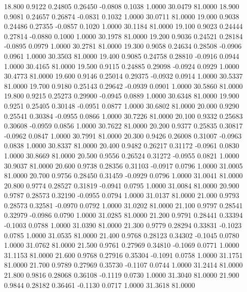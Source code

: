   18.800   0.9122   0.24805   0.26450  -0.0808   0.1038   1.0000  30.0479  81.0000
  18.900   0.9081   0.24657   0.26874  -0.0831   0.1032   1.0000  30.0711  81.0000
  19.000   0.9038   0.24486   0.27355  -0.0857   0.1020   1.0000  30.1184  81.0000
  19.100   0.9023   0.24444   0.27814  -0.0880   0.1000   1.0000  30.1978  81.0000
  19.200   0.9036   0.24521   0.28184  -0.0895   0.0979   1.0000  30.2781  81.0000
  19.300   0.9058   0.24634   0.28508  -0.0906   0.0961   1.0000  30.3503  81.0000
  19.400   0.9085   0.24758   0.28810  -0.0916   0.0944   1.0000  30.4165  81.0000
  19.500   0.9115   0.24885   0.29098  -0.0924   0.0929   1.0000  30.4773  81.0000
  19.600   0.9146   0.25014   0.29375  -0.0932   0.0914   1.0000  30.5337  81.0000
  19.700   0.9180   0.25143   0.29642  -0.0939   0.0901   1.0000  30.5860  81.0000
  19.800   0.9215   0.25273   0.29900  -0.0945   0.0889   1.0000  30.6348  81.0000
  19.900   0.9251   0.25405   0.30148  -0.0951   0.0877   1.0000  30.6802  81.0000
  20.000   0.9290   0.25541   0.30384  -0.0955   0.0866   1.0000  30.7226  81.0000
  20.100   0.9332   0.25683   0.30608  -0.0959   0.0856   1.0000  30.7622  81.0000
  20.200   0.9377   0.25835   0.30817  -0.0962   0.0847   1.0000  30.7991  81.0000
  20.300   0.9426   0.26008   0.31007  -0.0963   0.0838   1.0000  30.8337  81.0000
  20.400   0.9482   0.26217   0.31172  -0.0961   0.0830   1.0000  30.8669  81.0000
  20.500   0.9556   0.26524   0.31272  -0.0955   0.0821   1.0000  30.9037  81.0000
  20.600   0.9738   0.28356   0.31103  -0.0917   0.0796   1.0000  31.0005  81.0000
  20.700   0.9756   0.28450   0.31459  -0.0929   0.0796   1.0000  31.0041  81.0000
  20.800   0.9774   0.28527   0.31819  -0.0941   0.0795   1.0000  31.0084  81.0000
  20.900   0.9787   0.28573   0.32190  -0.0955   0.0794   1.0000  31.0137  81.0000
  21.000   0.9793   0.28573   0.32581  -0.0970   0.0792   1.0000  31.0202  81.0000
  21.100   0.9797   0.28541   0.32979  -0.0986   0.0790   1.0000  31.0285  81.0000
  21.200   0.9791   0.28441   0.33394  -0.1003   0.0788   1.0000  31.0390  81.0000
  21.300   0.9779   0.28294   0.33831  -0.1023   0.0785   1.0000  31.0535  81.0000
  21.400   0.9768   0.28123   0.34302  -0.1045   0.0780   1.0000  31.0762  81.0000
  21.500   0.9761   0.27969   0.34810  -0.1069   0.0771   1.0000  31.1153  81.0000
  21.600   0.9768   0.27916   0.35304  -0.1091   0.0758   1.0000  31.1751  81.0000
  21.700   0.9789   0.27969   0.35730  -0.1107   0.0744   1.0000  31.2414  81.0000
  21.800   0.9816   0.28068   0.36108  -0.1119   0.0730   1.0000  31.3040  81.0000
  21.900   0.9844   0.28182   0.36461  -0.1130   0.0717   1.0000  31.3618  81.0000

